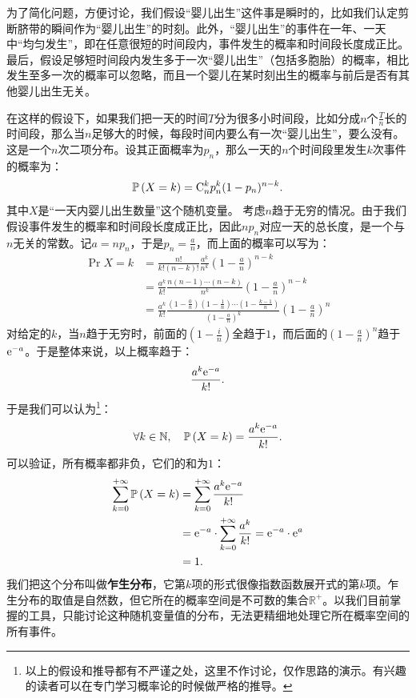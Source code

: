 \documentclass[12pt,UTF8,fontset=none]{ctexbook}
\begin{document}
\begin{so}
    为了简化问题，方便讨论，我们假设“婴儿出生”这件事是瞬时的，比如我们认定剪断脐带的瞬间作为“婴儿出生”的时刻。此外，“婴儿出生”的事件在一年、一天中“均匀发生”，即在任意很短的时间段内，事件发生的概率和时间段长度成正比。最后，假设足够短时间段内发生多于一次“婴儿出生”（包括多胞胎）的概率，相比发生至多一次的概率可以忽略，而且一个婴儿在某时刻出生的概率与前后是否有其他婴儿出生无关。

    在这样的假设下，如果我们把一天的时间$T$分为很多小时间段，比如分成$n$个$\frac{T}{n}$长的时间段，那么当$n$足够大的时候，每段时间内要么有一次“婴儿出生”，要么没有。这是一个$n$次二项分布。设其正面概率为$p_n$，那么一天的$n$个时间段里发生$k$次事件的概率为：
    $$ \mathbb{P}\left(X = k\right) = \mathrm{C}_{n}^{k} p_n^k(1 - p_n)^{n-k}. $$
    其中$X$是“一天内婴儿出生数量”这个随机变量。
    考虑$n$趋于无穷的情况。由于我们假设事件发生的概率和时间段长度成正比，因此$np_n$对应一天的总长度，是一个与$n$无关的常数。记$a = np_n$，于是$p_n = \frac{a}{n}$，而上面的概率可以写为：
    \begin{align*}
        \Pr{X = k} &= \frac{n!}{k!(n - k)!} \frac{a^k}{n^k}\left(1 - \frac{a}{n}\right)^{n-k} \\
        &= \frac{a^k}{k!} \frac{n(n - 1)\cdots(n - k)}{n^k}\left(1 - \frac{a}{n}\right)^{n-k} \\
        &= \frac{a^k}{k!} \frac{\left(1 - \frac{0}{n}\right) \left(1 - \frac{1}{n}\right)\cdots\left(1 - \frac{k-1}{n}\right)}{\left(1 - \frac{a}{n}\right)^k}\left(1 - \frac{a}{n}\right)^{n} 
    \end{align*}
    对给定的$k$，当$n$趋于无穷时，前面的$\left(1 - \frac{i}{n}\right)$全趋于$1$，而后面的$\left(1 - \frac{a}{n}\right)^{n}$趋于$\mathrm{e}^{-a}$。于是整体来说，以上概率趋于：
    $$ \frac{a^k\mathrm{e}^{-a}}{k!}. $$
    于是我们可以认为\footnote{以上的假设和推导都有不严谨之处，这里不作讨论，仅作思路的演示。有兴趣的读者可以在专门学习概率论的时候做严格的推导。}：
    $$ \forall k \in \mathbb{N}, \quad \mathbb{P}\left(X = k\right) = \frac{a^k\mathrm{e}^{-a}}{k!}. $$
    可以验证，所有概率都非负，它们的和为$1$：
    \begin{align*}
        \sum_{k=0}^{+\infty} \mathbb{P}\left(X = k\right) &= \sum_{k=0}^{+\infty} \frac{a^k\mathrm{e}^{-a}}{k!} \\
        &= \mathrm{e}^{-a} \cdot \sum_{k=0}^{+\infty} \frac{a^k}{k!} = \mathrm{e}^{-a} \cdot \mathrm{e}^{a} \\
        &= 1.
    \end{align*}
    我们把这个分布叫做\textbf{乍生分布}，它第$k$项的形式很像指数函数展开式的第$k$项。乍生分布的取值是自然数，但它所在的概率空间是不可数的集合$\mathbb{R}^+$。以我们目前掌握的工具，只能讨论这种随机变量值的分布，无法更精细地处理它所在概率空间的所有事件。


\end{so}
\end{document}
